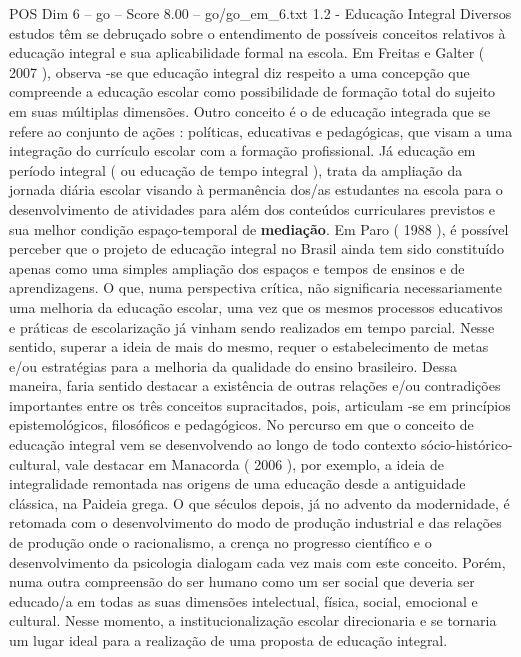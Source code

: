 \begin{textsample}{POS Dim 6 – go – Score 8.00 – go/go\_em\_6.txt}  \label{ex:f6_pos_117}
1.2 - Educação Integral Diversos estudos têm se debruçado sobre o entendimento de possíveis conceitos relativos à educação integral e sua aplicabilidade formal na escola.
Em Freitas e Galter ( 2007 ), observa -se que educação integral diz respeito a uma concepção que compreende a educação escolar como possibilidade de formação total do sujeito em suas múltiplas dimensões.
Outro conceito é o de educação integrada que se refere ao conjunto de ações : políticas, educativas e pedagógicas, que visam a uma integração do currículo escolar com a formação profissional.
Já educação em período integral ( ou educação de tempo integral ), trata da ampliação da jornada diária escolar visando à permanência dos/as estudantes na escola para o desenvolvimento de atividades para além dos conteúdos curriculares previstos e sua melhor condição espaço-temporal de \textbf{mediação}.
Em Paro ( 1988 ), é possível perceber que o projeto de educação integral no Brasil ainda tem sido constituído apenas como uma simples ampliação dos espaços e tempos de ensinos e de aprendizagens.
O que, numa perspectiva crítica, não significaria necessariamente uma melhoria da educação escolar, uma vez que os mesmos processos educativos e práticas de escolarização já vinham sendo realizados em tempo parcial.
Nesse sentido, superar a ideia de mais do mesmo, requer o estabelecimento de metas e/ou estratégias para a melhoria da qualidade do ensino brasileiro.
Dessa maneira, faria sentido destacar a existência de outras relações e/ou contradições importantes entre os três conceitos supracitados, pois, articulam -se em princípios epistemológicos, filosóficos e pedagógicos.
No percurso em que o conceito de educação integral vem se desenvolvendo ao longo de todo contexto sócio-histórico-cultural, vale destacar em Manacorda ( 2006 ), por exemplo, a ideia de integralidade remontada nas origens de uma educação desde a antiguidade clássica, na Paideia grega.
O que séculos depois, já no advento da modernidade, é retomada com o desenvolvimento do modo de produção industrial e das relações de produção onde o racionalismo, a crença no progresso científico e o desenvolvimento da psicologia dialogam cada vez mais com este conceito.
Porém, numa outra compreensão do ser humano como um ser social que deveria ser educado/a em todas as suas dimensões intelectual, física, social, emocional e cultural.
Nesse momento, a institucionalização escolar direcionaria e se tornaria um lugar ideal para a realização de uma proposta de educação integral.

\end{textsample}

